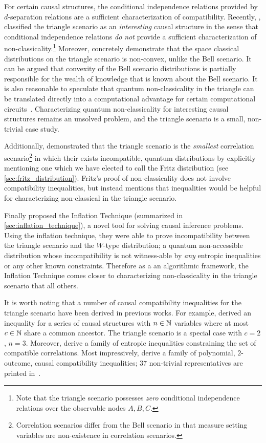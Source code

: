 \documentclass[aps, 10pt, english, twoside, pra, nofootinbib, tightenlines, longbibliography]{revtex4-1}
\begin{document}
    For certain causal structures, the conditional independence relations provided by $d$-separation relations are a sufficient characterization of compatibility. Recently, \citet{Henson_2014}, classified the triangle scenario as an \textit{interesting} causal structure in the sense that conditional independence relations \textit{do not} provide a sufficient characterization of non-classicality.\footnote{Note that the triangle scenario possesses \textit{zero} conditional independence relations over the observable nodes $A, B, C$.} Moreover, \citet{Inflation} concretely demonstrate that the space classical distributions on the triangle scenario is non-convex, unlike the Bell scenario. It can be argued that convexity of the Bell scenario distributions is partially responsible for the wealth of knowledge that is known about the Bell scenario. It is also reasonable to speculate that quantum non-classicality in the triangle can be translated directly into a computational advantage for certain computational circuits~\cite{Terhal_2002}. Characterizing quantum non-classicality for interesting causal structures remains an unsolved problem, and the triangle scenario is a small, non-trivial case study.

    Additionally, \citet{Fritz_2012} demonstrated that the triangle scenario is the \textit{smallest} correlation scenario\footnote{Correlation scenarios differ from the Bell scenario in that measure setting variables are non-existence in correlation scenarios.} in which their exists incompatible, quantum distributions by explicitly mentioning one which we have elected to call the Fritz distribution (see \cref{sec:fritz_distribution}). Fritz's proof of non-classicality does not involve compatibility inequalities, but instead mentions that inequalities would be helpful for characterizing non-classical in the triangle scenario.

    Finally \citet{Inflation} proposed the Inflation Technique (summarized in \cref{sec:inflation_technique}), a novel tool for solving causal inference problems. Using the inflation technique, they were able to prove incompatibility between the triangle scenario and the $W$-type distribution; a quantum non-accessible distribution whose incompatibility is not witness-able by \textit{any} entropic inequalities or any other known constraints. Therefore as a an algorithmic framework, the Inflation Technique comes closer to characterizing non-classicality in the triangle scenario that all others.

    It is worth noting that a number of causal compatibility inequalities for the triangle scenario have been derived in previous works. For example, \citet{Steudel_2010} derived an inequality for a series of causal structures with $n \in {\mathbb{N}}$ variables where at most $c \in {\mathbb{N}}$ share a common ancestor. The triangle scenario is a special case with $c = 2$, $n = 3$. Moreover, \citet{Henson_2014} derive a family of entropic inequalities constraining the set of compatible correlations. Most impressively, \citet{Inflation} derive a family of polynomial, $2$-outcome, causal compatibility inequalities; $37$ non-trivial representatives are printed in~\cite{Inflation}.
\end{document}
